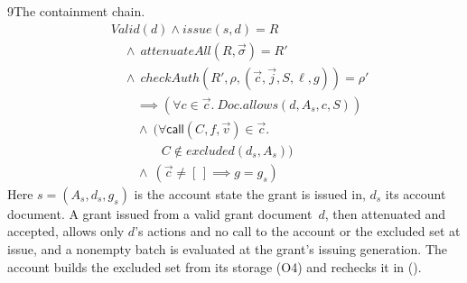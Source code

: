 \begin{perchstatement}{9}{The containment chain.}\label{stmt:the-containment-chain}
\[\begin{aligned}&\mathit{Valid}(d) \land \mathit{issue}(s, d) = R\\
&\quad \land\ \mathit{attenuateAll}(R, \vec\sigma) = R'\\
&\quad \land\ \mathit{checkAuth}(R', \rho, (\vec c, \vec j, S, \ell, g)) = \rho'\\
&\qquad \implies (\forall c \in \vec c.\ \mathit{Doc.allows}(d, A_s, c, S))\\
&\qquad \land\ (\forall \mathsf{call}(C, f, \vec v) \in \vec c.\\
&\qquad\qquad C \notin \mathit{excluded}(d_s, A_s))\\
&\qquad \land\ (\vec c \neq [\,] \implies g = g_s)\end{aligned}\]
Here $s = (A_s, d_s, g_s)$ is the account state the grant is issued in, $d_s$ its account document. A grant issued from a valid grant document~$d$, then attenuated and accepted, allows only $d$'s actions and no call to the account or the excluded set at issue, and a nonempty batch is evaluated at the grant's issuing generation. The account builds the excluded set from its storage (O4) and rechecks it in  ().
\end{perchstatement}
